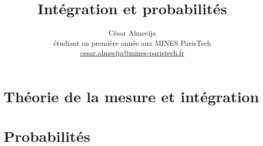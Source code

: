 \documentclass[french]{report}
\theoremstyle{plain}
\theoremstyle{definition}
\theoremstyle{remark}
\begin{document}
\title{Intégration et probabilités}

\author{César Almecija
\\ étudiant en première année aux MINES ParisTech
\\ \href{mailto:cesar.almecija@mines-paristech.fr}{cesar.almecija@mines-paristech.fr}}

\maketitle

\tableofcontents



\part{Théorie de la mesure et intégration}









\part{Probabilités}






\end{document}
